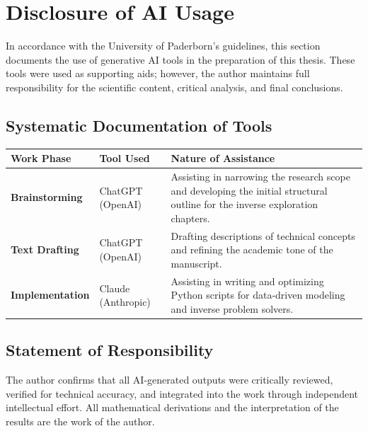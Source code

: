 \chapter*{Disclosure of AI Usage}

In accordance with the University of Paderborn's guidelines, this section documents the use of generative AI tools in the preparation of this thesis. These tools were used as supporting aids; however, the author maintains full responsibility for the scientific content, critical analysis, and final conclusions.

\section*{Systematic Documentation of Tools}

\begin{table}[h]
\centering
\small
\renewcommand{\arraystretch}{1.5}
\begin{tabular}{|p{3cm}|p{3.5cm}|p{7.5cm}|}
\hline
\textbf{Work Phase} & \textbf{Tool Used} & \textbf{Nature of Assistance} \\ \hline
\textbf{Brainstorming} & ChatGPT (OpenAI) & Assisting in narrowing the research scope and developing the initial structural outline for the inverse exploration chapters. \\ \hline
\textbf{Text Drafting} & ChatGPT (OpenAI) & Drafting descriptions of technical concepts and refining the academic tone of the manuscript. \\ \hline
\textbf{Implementation} & Claude (Anthropic) & Assisting in writing and optimizing Python scripts for data-driven modeling and inverse problem solvers. \\ \hline
\end{tabular}
\end{table}

\section*{Statement of Responsibility}
The author confirms that all AI-generated outputs were critically reviewed, verified for technical accuracy, and integrated into the work through independent intellectual effort. All mathematical derivations and the interpretation of the results are the work of the author.
